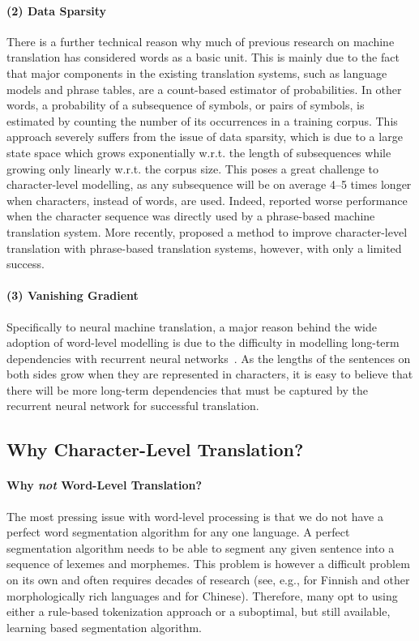 \documentclass[11pt]{article}
\begin{document}
\paragraph{(2) Data Sparsity}
There is a further technical reason why much of previous research on machine
translation has considered words as a basic unit. This is mainly due to the fact
that major components in the existing translation systems, such as language
models and phrase tables, are a count-based estimator of probabilities. In other
words, a probability of a subsequence of symbols, or pairs of symbols, is
estimated by counting the number of its occurrences in a training corpus. This
approach severely suffers from the issue of data sparsity, which is due to a
large state space which grows exponentially w.r.t. the length of subsequences
while growing only linearly w.r.t. the corpus size.
This poses a great challenge to character-level modelling, as any subsequence
will be on average 4--5 times longer when characters, instead of words, are
used. Indeed,  reported worse performance when the
character sequence was directly used by a phrase-based machine translation
system. More recently,  proposed a method
to improve character-level translation with phrase-based translation systems,
however, with only a limited success. 

\paragraph{(3) Vanishing Gradient}
Specifically to neural machine translation, a major reason behind the wide
adoption of word-level modelling is due to the difficulty in modelling long-term
dependencies with recurrent neural
networks~\cite{bengio1994learning,hochreiter1998vanishing}. As the lengths of
the sentences on both sides grow 
when they are represented in characters, it is easy to believe that there will
be more long-term dependencies that must be captured by the recurrent neural
network for successful translation. 

\subsection{Why Character-Level Translation?}

\paragraph{Why {\it not} Word-Level Translation?}
The most pressing issue with word-level processing is that we do not have a
perfect word segmentation algorithm for any one language. A perfect segmentation
algorithm needs to be able to segment any given sentence into a sequence of
lexemes and morphemes. This problem is however a difficult problem on its own
and often requires decades of research (see, e.g., 
for Finnish and other morphologically rich languages and 
for Chinese). Therefore, many opt to using either a rule-based tokenization
approach or a suboptimal, but still available, learning based
segmentation algorithm. 
\end{document}
